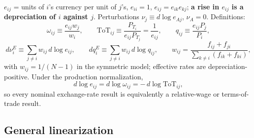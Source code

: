 \documentclass[11pt]{article}
\begin{document}
$e_{ij}$ = units of $i$'s currency per unit of $j$'s, $e_{ii} = 1$, $e_{ij} = e_{ik}e_{kj}$; \textbf{a rise in $e_{ij}$ is a depreciation of $i$ against $j$}. Perturbations $\nu_j \equiv d\log e_{Aj}$, $\nu_A = 0$. Definitions:
\begin{equation}
\omega_{ij} \equiv \frac{e_{ij} w_j}{w_i},
\qquad
\mathrm{ToT}_{ij} \equiv \frac{P_{T_i}}{e_{ij} P_{T_j}} = \frac{1}{e_{ij}},
\qquad
q_{ij} \equiv \frac{e_{ij} P_j}{P_i},
\label{eq:rer}
\end{equation}
\begin{equation}
d\nu_i^{E} \equiv \sum_{j \neq i} w_{ij}\, d\log e_{ij},
\qquad
d q_i^{E} \equiv \sum_{j \neq i} w_{ij}\, d\log q_{ij},
\qquad
w_{ij} = \frac{f_{ij} + f_{ji}}{\sum_{k\neq i} (f_{ik} + f_{ki})} ,
\label{eq:neer}
\end{equation}
with $w_{ij} = 1/(N-1)$ in the symmetric model; effective rates are depreciation-positive. Under the production normalization,
\begin{equation}
d\log e_{ij} = d\log \omega_{ij} = -\,d\log \mathrm{ToT}_{ij} ,
\label{eq:onetoone}
\end{equation}
so every nominal exchange-rate result is equivalently a relative-wage or terms-of-trade result.

\subsection{General linearization}
\end{document}
